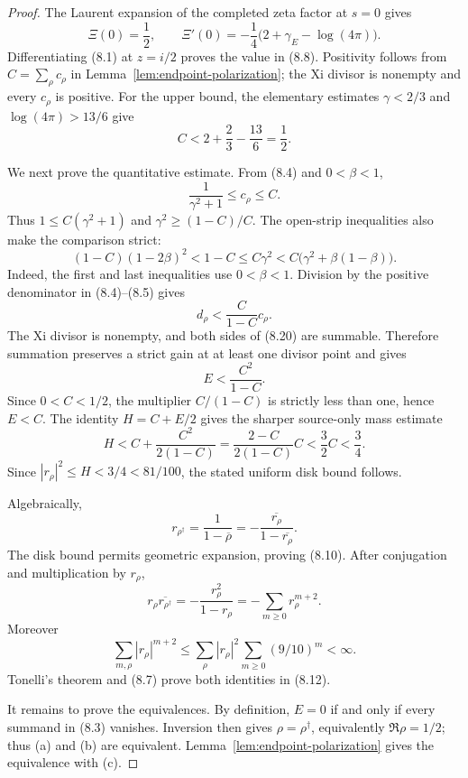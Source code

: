 \documentclass[11pt]{article}
\newcommand{\XiR}{\Xi}
\begin{document}
\begin{proof}
The Laurent expansion of the completed zeta factor at $s=0$ gives
\[
 \XiR(0)=\frac12,\qquad
 \XiR'(0)=-\frac14\bigl(2+\gamma_{\!E}-\log(4\pi)\bigr).
 \tag{8.17}
\]
Differentiating \textup{(8.1)} at $z=i/2$ proves the value in \textup{(8.8)}.  Positivity follows
from $C=\sum_\rho c_\rho$ in Lemma~\ref{lem:endpoint-polarization}; the Xi divisor is nonempty
and every $c_\rho$ is positive.  For the upper bound, the elementary estimates
$\gamma<2/3$ and $\log(4\pi)>13/6$ give
\[
 C<2+\frac23-\frac{13}6=\frac12.
\]

We next prove the quantitative estimate.  From \textup{(8.4)} and $0<\beta<1$,
\[
 \frac1{\gamma^2+1}\le c_\rho\le C.
 \tag{8.18}
\]
Thus $1\le C(\gamma^2+1)$ and
$\gamma^2\ge(1-C)/C$.  The open-strip inequalities also make the comparison strict:
\[
 (1-C)(1-2\beta)^2
 <1-C\le C\gamma^2
 <C\bigl(\gamma^2+\beta(1-\beta)\bigr).
 \tag{8.19}
\]
Indeed, the first and last inequalities use $0<\beta<1$.  Division by the positive denominator
in \textup{(8.4)}--\textup{(8.5)} gives
\[
 d_\rho<\frac{C}{1-C}c_\rho.
 \tag{8.20}
\]
The Xi divisor is nonempty, and both sides of \textup{(8.20)} are summable.  Therefore summation
preserves a strict gain at at least one divisor point and gives
\[
 E<\frac{C^2}{1-C}.
\]
Since $0<C<1/2$, the multiplier $C/(1-C)$ is strictly less than one, hence $E<C$.  The identity
$H=C+E/2$ gives the sharper source-only mass estimate
\[
 H<C+\frac{C^2}{2(1-C)}
   =\frac{2-C}{2(1-C)}C<\frac32C<\frac34.
\]
Since $|r_\rho|^2\le H<3/4<81/100$, the stated uniform disk bound follows.

Algebraically,
\[
 r_{\rho^\dagger}
 =\frac1{1-\overline\rho}
 =-\frac{\overline{r_\rho}}{1-\overline{r_\rho}}.
\]
The disk bound permits geometric expansion, proving \textup{(8.10)}.  After conjugation and
multiplication by $r_\rho$,
\[
 r_\rho\overline{r_{\rho^\dagger}}
 =-\frac{r_\rho^2}{1-r_\rho}
 =-\sum_{m\ge0}r_\rho^{m+2}.
 \tag{8.21}
\]
Moreover
\[
 \sum_{m,\rho}|r_\rho|^{m+2}
 \le\sum_\rho|r_\rho|^2\sum_{m\ge0}(9/10)^m<\infty.
\]
Tonelli's theorem and \textup{(8.7)} prove both identities in \textup{(8.12)}.

It remains to prove the equivalences.  By definition, $E=0$ if and only if every summand in
\textup{(8.3)} vanishes.  Inversion then gives
$\rho=\rho^\dagger$, equivalently $\Re\rho=1/2$; thus
\textup{(a)} and \textup{(b)} are equivalent.  Lemma~\ref{lem:endpoint-polarization} gives the
equivalence with \textup{(c)}.


\end{proof}
\end{document}
